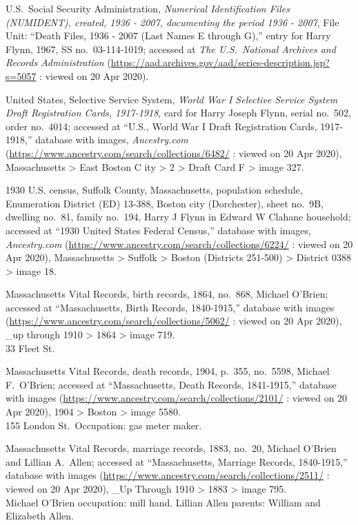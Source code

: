 \begin{thebibliography}{999}
	U.S.\ Social Security Administration, \textit{Numerical Identification Files (NUMIDENT), created, 1936 - 2007, documenting the period 1936 - 2007}, File Unit: ``Death Files, 1936 - 2007 (Last Names E through G),'' entry for Harry Flynn, 1967,  SS no.\ 03-114-1019; accessed at \textit{The U.S.\ National Archives and Records Administration} (\url{https://aad.archives.gov/aad/series-description.jsp?s=5057} : viewed on 20 Apr 2020).
	
	United States, Selective Service System, \textit{World War I Selective Service System Draft Registration Cards, 1917-1918}, card for Harry Joseph Flynn, serial no.\ 502, order no.\ 4014; accessed at ``U.S., World War I Draft Registration Cards, 1917-1918,'' database with images, \textit{Ancestry.com} (\url{https://www.ancestry.com/search/collections/6482/} : viewed on 20 Apr 2020), Massachusetts > East Boston C ity > 2 > Draft Card F > image 327.
	
	1930 U.S. census, Suffolk County, Massachusetts, population schedule, Enumeration District (ED) 13-388, Boston city (Dorchester), sheet no.\ 9B, dwelling no.\ 81, family no.\ 194, Harry J Flynn in Edward W Clahane household; accessed at ``1930 United States Federal Census,'' database with images, \textit{Ancestry.com} (\url{https://www.ancestry.com/search/collections/6224/} : viewed on 20 Apr 2020), Massachusetts > Suffolk > Boston (Districts 251-500) > District 0388 > image 18.
	
	Massachusetts Vital Records, birth records, 1864, no.\ 868, Michael O'Brien; accessed at ``Massachusetts, Birth Records, 1840-1915,'' database with images (\url{https://www.ancestry.com/search/collections/5062/} : viewed on 20 Apr 2020), \_up through 1910 > 1864 > image 719.\\
	33 Fleet St.
	
	Massachusetts Vital Records, death records, 1904, p.\ 355, no.\ 5598, Michael F.\ O'Brien; accessed at ``Massachusetts, Death Records, 1841-1915,'' database with images (\url{https://www.ancestry.com/search/collections/2101/} : viewed on 20 Apr 2020), 1904 > Boston > image 5580.\\
	155 London St.\ Occupation: gas meter maker.
	
	Massachusetts Vital Records, marriage records, 1883, no.\ 20, Michael O'Brien and Lillian A.\ Allen; accessed at ``Massachusetts, Marriage Records, 1840-1915,'' database with images (\url{https://www.ancestry.com/search/collections/2511/} : viewed on 20 Apr 2020), \_Up Through 1910 > 1883 > image 795.\\
	Michael O'Brien occupation: mill hand. Lillian Allen parents: William and Elizabeth Allen.
	

\end{thebibliography}
